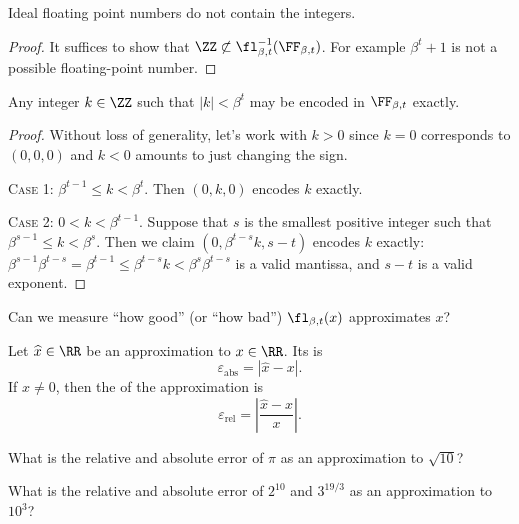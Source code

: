 \begin{thm}
Ideal floating point numbers do not contain the integers.
\end{thm}
\begin{proof}
It suffices to show that $\ZZ\not\subset\fl_{\beta,t}^{-1}(\FF_{\beta,t})$.
For example $\beta^{t}+1$ is not a possible floating-point number.
\end{proof}
\begin{cor}\label{cor:ideal-floats:ints-representable-by-floats}
Any integer $k\in\ZZ$ such that $|k|<\beta^{t}$ may be encoded in
$\FF_{\beta,t}$ exactly.
\end{cor}
\begin{proof}
  Without loss of generality, let's work with $k>0$ since $k=0$
  corresponds to $(0,0,0)$ and $k<0$ amounts to just changing the sign.

  \textsc{Case 1:} $\beta^{t-1}\leq k<\beta^{t}$. Then $(0,k,0)$ encodes
  $k$ exactly.

  \textsc{Case 2:} $0<k<\beta^{t-1}$. Suppose that $s$ is the smallest
  positive integer such that $\beta^{s-1}\leq k<\beta^{s}$. Then we
  claim $(0, \beta^{t-s}k, s-t)$ encodes $k$ exactly:
  $\beta^{s-1}\beta^{t-s}=\beta^{t-1}\leq \beta^{t-s}k < \beta^{s}\beta^{t-s}$
  is a valid mantissa, and $s-t$ is a valid exponent.
\end{proof}

\begin{puzzle}
Can we measure ``how good'' (or ``how bad'') $\fl_{\beta,t}(x)$
approximates $x$?
\end{puzzle}

\begin{defn}\label{defn:absolute-error}\label{defn:relative-error}
  Let $\widehat{x}\in\RR$ be an approximation to $x\in\RR$. Its
   is
  \begin{equation}
    \varepsilon_{\text{abs}} = |\widehat{x} - x|.
  \end{equation}
  If $x\neq0$, then the  of the approximation is
  \begin{equation}
    \varepsilon_{\text{rel}} = \left|\frac{\widehat{x}-x}{x}\right|.
  \end{equation}
\end{defn}

\begin{xca}
What is the relative and absolute error of $\pi$ as an approximation to $\sqrt{10}$?
\end{xca}
\begin{xca}
What is the relative and absolute error of $2^{10}$ and $3^{19/3}$ as an
approximation to $10^{3}$?
\end{xca}

